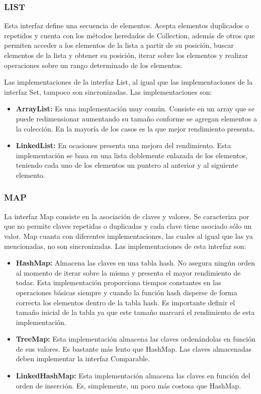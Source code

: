 \documentclass[12pt, letterpaper]{report}
\begin{document}
\subsubsection*{LIST}

Esta interfaz define una secuencia de elementos. Acepta elementos duplicados o repetidos y cuenta con los métodos heredados de Collection, además de otros que permiten acceder a los elementos de la lista a partir de su posición, buscar elementos de la lista y obtener su posición, iterar sobre los elementos y realizar operaciones sobre un rango determinado de los elementos. 

Las implementaciones de la interfaz List, al igual que las implementaciones de la interfaz Set, tampoco son sincronizadas. Las implementaciones son:

\begin{itemize}
  \item \textbf{ArrayList:} Es una implementación muy común. Consiste en un array que se puede redimensionar aumentando su tamaño conforme se agregan elementos a la colección. En la mayoría de los casos es la que mejor rendimiento presenta.
  \item \textbf{LinkedList:} En ocasiones presenta una mejora del rendimiento. Esta implementación se basa en una lista doblemente enlazada de los elementos, teniendo cada uno de los elementos un puntero al anterior y al siguiente elemento.
\end{itemize}

\subsubsection*{MAP}

La interfaz Map consiste en la asociación de claves y valores. Se caracteriza por que no permite claves repetidas o duplicadas y cada clave tiene asociado sólo un valor. Map cuanta con diferentes implementaciones, las cuales al igual que las ya mencionadas, no son sincronizadas. Las implementaciones de esta interfaz son:

\begin{itemize}
  \item \textbf{HashMap:} Almacena las claves en una tabla hash. No asegura ningún orden al momento de iterar sobre la misma y presenta el mayor rendimiento de todas. Esta implementación proporciona tiempos constantes en las operaciones básicas siempre y cuando la función hash disperse de forma correcta los elementos dentro de la tabla hash. Es importante definir el tamaño inicial de la tabla ya que este tamaño marcará el rendimiento de esta implementación.
  \item \textbf{TreeMap:} Esta implementación almacena las claves ordenándolas en función de sus valores. Es bastante más lento que HashMap. Las claves almacenadas deben implementar la interfaz Comparable.
  \item \textbf{LinkedHashMap:} Esta implementación almacena las claves en función del orden de inserción. Es, simplemente, un poco más costosa que HashMap.
\end{itemize}
\end{document}
